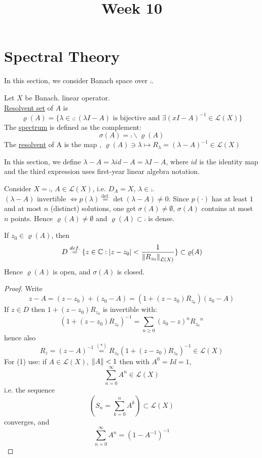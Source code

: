 \documentclass{article}
\title{Week 10}
\begin{document}
\maketitle


\section{Spectral Theory}
In this section, we consider Banach space over $\comp$. 

\begin{definition}\nl
Let $X$ be Banach.   linear operator.\\
{\underline{Resolvent set}} of $A$ is
$$
\varrho({A})=
\{
\lambda\in\comp:(\lambda I-A) \text{ is bijective and } \exists (xI-A)^{-1}\in \mathcal{L}(X)
\}
$$
The {\underline{spectrum}} is defined as the complement:
$$
\sigma(A)=\comp\backslash\varrho(A)
$$
The {\underline{resolvent}} of A is the map , $\varrho(A)\ni\lambda\mapsto R_\lambda= (\lambda-A)^{-1}\in\mathcal{L}(X)$
\end{definition}

\begin{remark}\nl
    In this section, we define $\lambda-A=\lambda id -A=\lambda I-A$, where $id$ is the identity map and the third expression uses first-year linear algebra notation.
\end{remark}

\begin{example}\nl
    Consider $X=\comp$, $A\in \mathcal{L}(X)$, i.e. $D_A=X$, $\lambda\in\comp$.\\
    $(\lambda-A)$ invertible $\iff p(\lambda)\stackrel{\text{def.}}{=}\det(\lambda-A)\neq0$. Since  $p(\cdot)$ has at least $1$ and at most $n$ (distinct) solutions, one get $\sigma(A)\neq \emptyset$, $\sigma(A)$ contains at most $n$ points. Hence $\varrho(A)\neq\emptyset$ and $\varrho(A)\subset\comp$ is dense.
\end{example}

\begin{lemma}\nl
\label{spectrum is closed}
If $z_0\in\varrho(A)$, then 
$$D\stackrel{def.}{=}
\{
z\in\mathbb{C}:|z-z_0|<\frac{1}{\left\|{R_{z_0}}\right\|_{\mathcal{L}(X)}}
\}
\subset\varrho(A)$$
Hence $\varrho(A)$ is open, and $\sigma(A)$ is closed.
\end{lemma}

\begin{proof}
Write 
$$
z-A=
( z-z_0)+(z_0-A)=(1+(z-z_0)R_{z_0})(z_0-A)
$$
If $z\in D$ then $1+(z-z_0)R_{z_0}$ is invertible with:
\[
(1+(z-z_0)R_{z_0})^{-1}=\sum_{n\geq0}(z_0-z)^n {R_{z_0}}^n\tag{1}
\]
hence also
$$
R_z=(z-A)^{-1}\stackrel{(*)}{=}R_{z_0}(1+(z-z_0)R_{z_0})^{-1}\in\mathcal{L}(X)
$$
For (1) use: if $A\in\mathcal{L}(X)$, $\left\|{A}\right\|<1$ then with $A^0=Id=1$, 
$$
\sum_{n=0}^\infty A^n\in\mathcal{L}(X)
$$
i.e. the sequence
$$
\left(
S_n=\sum_{k=0}^n A^k
\right)\subset\mathcal{L}(X)
$$
converges, and
$$
\sum_{n=0}^\infty A^n=(1-A^{-1})^{-1}
$$
\end{proof}
\end{document}
